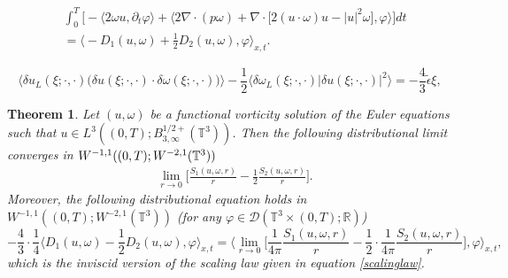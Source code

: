 \documentclass[10pt,a4paper]{amsart}
\newtheorem{theorem}{Theorem}
\begin{document}
\begin{align}
&\int_0^T \bigg[ - \bigg\langle 2 \omega u, \partial_t \varphi \bigg\rangle + \bigg\langle  2 \nabla \cdot (p \omega) + \nabla \cdot \big[ 2 (u \cdot \omega) u - \lvert u \rvert^2 \omega \big], \varphi \bigg\rangle \bigg] dt \nonumber \\
&= \bigg\langle - D_{1} (u, \omega) + \frac{1}{2} D_{2} (u, \omega) ,  \varphi \bigg\rangle_{x,t}. \label{limithelicitybalance}
\end{align}

\begin{equation} \label{scalinglaw}
\big\langle \delta u_L (\xi;\cdot,\cdot) \big( \delta u (\xi;\cdot,\cdot) \cdot \delta \omega (\xi;\cdot,\cdot) \big) \rangle - \frac{1}{2} \langle \delta \omega_L (\xi;\cdot,\cdot) \lvert \delta u(\xi;\cdot,\cdot) \rvert^2 \rangle = - \frac{4}{3} \tilde{\epsilon} \xi,
\end{equation}

\begin{theorem} \label{scalingthm}
Let $(u,\omega)$ be a functional vorticity solution of the Euler equations such that $u \in L^3 ((0,T);B^{1/2+}_{3,\infty} (\mathbb{T}^3))$. Then the following distributional limit converges in $W^{-1,1} ((0,T); \linebreak W^{-2,1} (\mathbb{T}^3))$
\begin{align}
&\lim_{r \rightarrow 0} \bigg[ \frac{S_1 (u,\omega,r)}{r} - \frac{1}{2} \frac{S_2 (u,\omega,r)}{r} \bigg].
\end{align}
Moreover, the following distributional equation holds in $W^{-1,1} ((0,T); W^{-2,1} (\mathbb{T}^3))$ (for any $\varphi \in \mathcal{D} (\mathbb{T}^3 \times (0,T);\mathbb{R})$)
\begin{equation}
-\frac{4}{3} \cdot \frac{1}{4} \bigg\langle D_{1} (u, \omega) - \frac{1}{2} D_{2} (u, \omega) , \varphi \bigg\rangle_{x,t} = \bigg\langle \lim_{r \rightarrow 0} \bigg[ \frac{1}{4 \pi} \frac{S_1 (u,\omega,r)}{r} - \frac{1}{2} \cdot \frac{1}{4 \pi} \frac{S_2 (u,\omega,r)}{r} \bigg] , \varphi \bigg\rangle_{x,t},
\end{equation}
which is the inviscid version of the scaling law given in equation \eqref{scalinglaw}.
\end{theorem}
\end{document}
